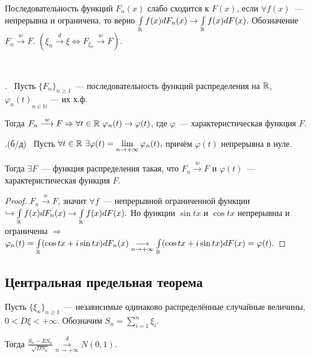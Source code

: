 	\begin{definition}
		Последовательность функций \(F_n(x)\) слабо сходится к \(F(x)\), если \(\forall f(x)\)~---  непрерывна и ограничена, то верно \(\int\limits_{\mathbb{R}} f(x) dF_n(x) \to \int\limits_{\mathbb{R}} f(x)dF(x).\) Обозначение \(F_n \overset{w}{\longrightarrow}F.\)
		\((\xi_n \overset{d}{\longrightarrow}\xi \Leftrightarrow F_{\xi_n} \overset{w}{\longrightarrow}F).\)
	\end{definition}
	\begin{theorem}~~~~~~~~~~~~~~~~~~~~~~~~~~~~~~~~~~~~~~~~~

		. ~Пусть \(\{F_n\}_{n \geqslant 1}\)~--- последовательность функций распределения на \(\mathbb{R}\), \({\varphi_n(t)}_{n \in \mathbb{N}}\) --- их х.ф. 
		
		Тогда  \(F_n \overset{w}{\longrightarrow}F \Rightarrow \forall t \in \mathbb{R}~\varphi_n(t) \to \varphi(t)\), где \(\varphi\)~--- характеристическая функция \(F\).
		
		.(б/д)~ Пусть \(\forall t \in \mathbb{R} ~ \exists \varphi(t) = \lim\limits_{n \to +\infty} \varphi_n(t), \) причём \(\varphi(t)\) непрерывна в нуле. 
		
		Тогда \(\exists F\)~--- функция распределения такая, что \(F_n \overset{w}{\longrightarrow}F\) и \(\varphi(t)\)~---характеристическая функция \(F\).
	\end{theorem}

	\begin{proof}
		\(F_n \overset{w}{\longrightarrow} F \), значит \(\forall f\)~--- непрерывной ограниченной функции \(\hookrightarrow \int\limits_{\mathbb{R}} f(x)dF_n(x) \to \int\limits_{\mathbb{R}} f(x)dF(x).\) Но функции \(\sin tx \) и \(\cos tx\) непрерывны и ограничены \(\Rightarrow\) \(\varphi_n(t) = \int\limits_{\mathbb{R}} (\cos tx + i\sin tx)dF_n(x) \underset{n \to +\infty}{\longrightarrow} \int\limits_{\mathbb{R}} (\cos tx + i\sin tx)dF(x) = \varphi(t).\)
	\end{proof}

	\subsection{Центральная предельная теорема}
	\begin{theorem}
		Пусть \(\{\xi_n\}_{n\geqslant 1}\)~--- независимые одинаково распределённые случайные величины, \(0 < D\xi < +\infty.\)
		Обозначим \(S_n = \sum\limits_{i = 1}^{n}\xi_i.\) 
		
		Тогда 
		\(\frac{S_n - ES_n}{\sqrt{DS_n}} \overset{d}{\underset{n \to +\infty}{\longrightarrow}}N(0, 1).\)
	\end{theorem}

